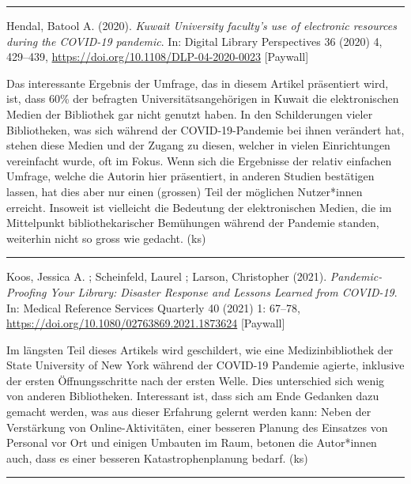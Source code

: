 \documentclass[a4paper,
fontsize=11pt,
oneside,
numbers=noperiodatend,
parskip=half-,
bibliography=totoc,
final
]{scrartcl}
\begin{document}
\begin{center}\rule{0.5\linewidth}{0.5pt}\end{center}

Hendal, Batool A. (2020). \emph{Kuwait University faculty's use of
electronic resources during the COVID-19 pandemic}. In: Digital Library
Perspectives 36 (2020) 4, 429--439,
\url{https://doi.org/10.1108/DLP-04-2020-0023} {[}Paywall{]}

Das interessante Ergebnis der Umfrage, das in diesem Artikel präsentiert
wird, ist, dass 60\% der befragten Universitätsangehörigen in Kuwait die
elektronischen Medien der Bibliothek gar nicht genutzt haben. In den
Schilderungen vieler Bibliotheken, was sich während der
COVID-19-Pandemie bei ihnen verändert hat, stehen diese Medien und der
Zugang zu diesen, welcher in vielen Einrichtungen vereinfacht wurde, oft
im Fokus. Wenn sich die Ergebnisse der relativ einfachen Umfrage, welche
die Autorin hier präsentiert, in anderen Studien bestätigen lassen, hat
dies aber nur einen (grossen) Teil der möglichen Nutzer*innen erreicht.
Insoweit ist vielleicht die Bedeutung der elektronischen Medien, die im
Mittelpunkt bibliothekarischer Bemühungen während der Pandemie standen,
weiterhin nicht so gross wie gedacht. (ks)

\begin{center}\rule{0.5\linewidth}{0.5pt}\end{center}

Koos, Jessica A. ; Scheinfeld, Laurel ; Larson, Christopher (2021).
\emph{Pandemic-Proofing Your Library: Disaster Response and Lessons
Learned from COVID-19}. In: Medical Reference Services Quarterly 40
(2021) 1: 67--78, \url{https://doi.org/10.1080/02763869.2021.1873624}
{[}Paywall{]}

Im längsten Teil dieses Artikels wird geschildert, wie eine
Medizinbibliothek der State University of New York während der COVID-19
Pandemie agierte, inklusive der ersten Öffnungsschritte nach der ersten
Welle. Dies unterschied sich wenig von anderen Bibliotheken. Interessant
ist, dass sich am Ende Gedanken dazu gemacht werden, was aus dieser
Erfahrung gelernt werden kann: Neben der Verstärkung von
Online-Aktivitäten, einer besseren Planung des Einsatzes von Personal
vor Ort und einigen Umbauten im Raum, betonen die Autor*innen auch, dass
es einer besseren Katastrophenplanung bedarf. (ks)

\begin{center}\rule{0.5\linewidth}{0.5pt}\end{center}
\end{document}
